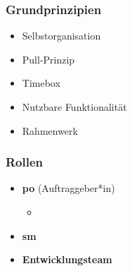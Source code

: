 \documentclass[main.tex]{subfiles}
\begin{document}
\subsubsection*{Grundprinzipien}
\begin{itemize}
    \item Selbstorganisation
    \item Pull-Prinzip
    \item Timebox
    \item Nutzbare Funktionalität
    \item Rahmenwerk
\end{itemize}
\subsubsection*{Rollen}
\begin{itemize}
    \item \textbf{\gls{po}} (Auftraggeber*in) 
    \begin{itemize}
        \item 
    \end{itemize}
    \item \textbf{\gls{sm}}
    \item \textbf{Entwicklungsteam}
\end{itemize}
\end{document}
